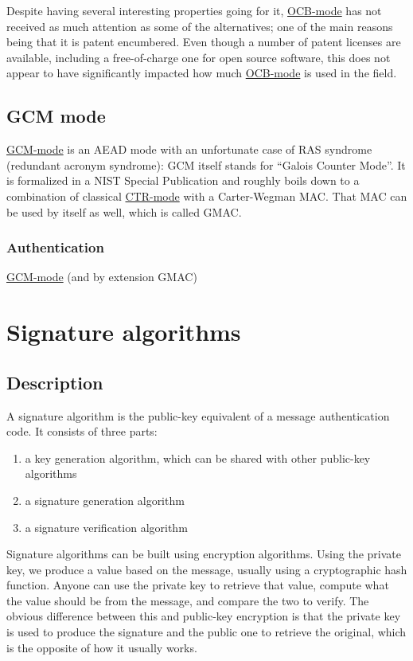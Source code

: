 \documentclass[11pt,ebook,table,dvipsnames]{memoir}
\begin{document}
Despite having several interesting properties going for it, \hyperref[OCB mode]{OCB-mode}
has not received as much attention as some of the alternatives; one of
the main reasons being that it is patent encumbered. Even though a
number of patent licenses are available\cite{ocb:license}, including a
free-of-charge one for open source software, this does not appear to
have significantly impacted how much \hyperref[OCB mode]{OCB-mode} is used in the field.
\section{\label{GCM-mode}GCM mode}
\label{sec-2-7-9}

\hyperref[GCM mode]{GCM-mode} is an \gls{AEAD mode} with an unfortunate case of RAS
syndrome (redundant acronym syndrome): GCM itself stands for \enquote{Galois
Counter Mode}. It is formalized in a NIST Special
Publication\cite{gcm} and roughly boils down to a combination of
classical \hyperref[CTR mode]{CTR-mode} with a \gls{Carter-Wegman MAC}. That MAC can be
used by itself as well, which is called \gls{GMAC}.

\subsection{Authentication}
\label{sec-2-7-9-1}

\hyperref[GCM mode]{GCM-mode} (and by extension GMAC)
\chapter{Signature algorithms}
\label{sec-2-8}
\section{Description}
\label{sec-2-8-1}

A signature algorithm is the public-key equivalent of a message
authentication code. It consists of three parts:

\begin{enumerate}
\item a key generation algorithm, which can be shared with other
public-key algorithms
\item a signature generation algorithm
\item a signature verification algorithm
\end{enumerate}

Signature algorithms can be built using encryption algorithms. Using
the private key, we produce a value based on the message, usually
using a cryptographic hash function. Anyone can use the private key to
retrieve that value, compute what the value should be from the
message, and compare the two to verify. The obvious difference between
this and \gls{public-key encryption} is that the private key is used
to produce the signature and the public one to retrieve the original,
which is the opposite of how it usually works.
\end{document}
